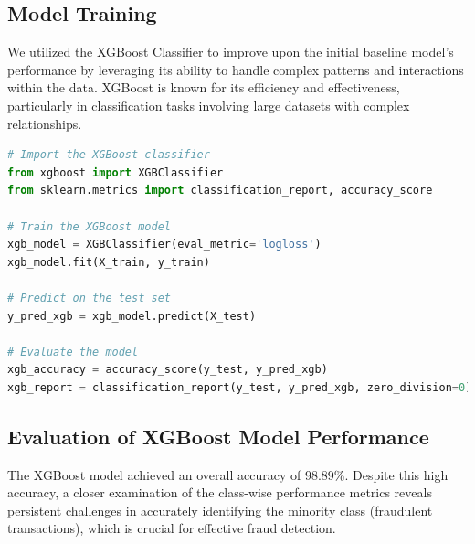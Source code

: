 \documentclass[12pt,a4paper]{report}
\begin{document}
\subsection{Model Training}

We utilized the XGBoost Classifier to improve upon the initial baseline model's performance by leveraging its ability to handle complex patterns and interactions within the data. XGBoost is known for its efficiency and effectiveness, particularly in classification tasks involving large datasets with complex relationships.\\

\begin{lstlisting}[language=Python, caption={Training and Evaluation of XGBoost Model}]
# Import the XGBoost classifier
from xgboost import XGBClassifier
from sklearn.metrics import classification_report, accuracy_score

# Train the XGBoost model
xgb_model = XGBClassifier(eval_metric='logloss')
xgb_model.fit(X_train, y_train)

# Predict on the test set
y_pred_xgb = xgb_model.predict(X_test)

# Evaluate the model
xgb_accuracy = accuracy_score(y_test, y_pred_xgb)
xgb_report = classification_report(y_test, y_pred_xgb, zero_division=0)

\end{lstlisting}

\subsection{Evaluation of XGBoost Model Performance}

The XGBoost model achieved an overall accuracy of 98.89\%. Despite this high accuracy, a closer examination of the class-wise performance metrics reveals persistent challenges in accurately identifying the minority class (fraudulent transactions), which is crucial for effective fraud detection.
\end{document}
